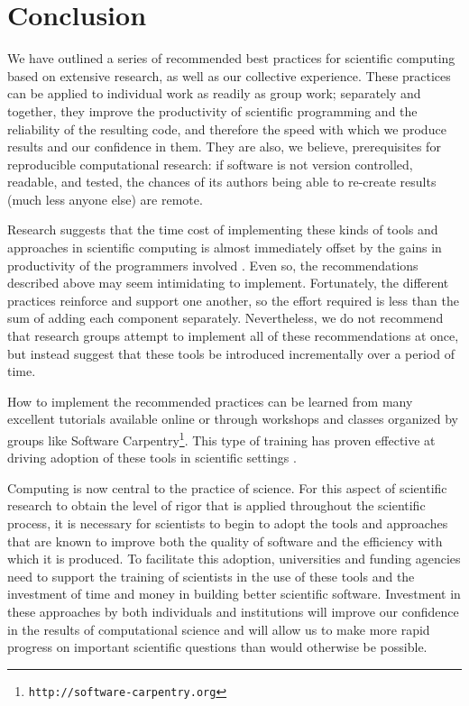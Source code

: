 \documentclass{article}
\newcommand{\footurl}[1]{\footnote{\texttt{#1}}}
\begin{document}
\section{Conclusion}\label{conclusion}

We have outlined a series of recommended best practices for scientific
computing based on extensive research, as well as our collective
experience.  These practices can be applied to individual work as
readily as group work; separately and together, they improve the
productivity of scientific programming and the reliability of the
resulting code, and therefore the speed with which we produce results
and our confidence in them.  They are also, we believe, prerequisites
for reproducible computational research: if software is not version
controlled, readable, and tested, the chances of its authors being
able to re-create results (much less anyone else) are remote.

Research suggests that the time cost of implementing these kinds of
tools and approaches in scientific computing is almost immediately
offset by the gains in productivity of the programmers involved
\cite{aranda2012}. Even so, the recommendations described above may
seem intimidating to implement.  Fortunately, the different practices
reinforce and support one another, so the effort required is less than
the sum of adding each component separately. Nevertheless, we do not
recommend that research groups attempt to implement all of these
recommendations at once, but instead suggest that these tools be
introduced incrementally over a period of time.

How to implement the recommended practices can be learned from many
excellent tutorials available online or through workshops and classes
organized by groups like Software
Carpentry\footurl{http://software-carpentry.org}. This type of
training has proven effective at driving adoption of these tools in
scientific settings \cite{aranda2012,wilson2013}.

Computing is now central to the practice of science. For this aspect
of scientific research to obtain the level of rigor that is applied
throughout the scientific process, it is necessary for scientists to
begin to adopt the tools and approaches that are known to improve both
the quality of software and the efficiency with which it is
produced. To facilitate this adoption, universities and funding
agencies need to support the training of scientists in the use of
these tools and the investment of time and money in building better
scientific software. Investment in these approaches by both
individuals and institutions will improve our confidence in the
results of computational science and will allow us to make more rapid
progress on important scientific questions than would otherwise be
possible.
\end{document}
